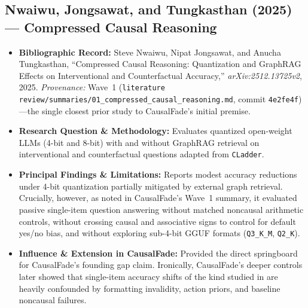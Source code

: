 \subsection{Nwaiwu, Jongsawat, and Tungkasthan (2025) --- Compressed Causal Reasoning \citep{nwaiwu2025compressed}}
\begin{itemize}
  \item \textbf{Bibliographic Record:} Steve Nwaiwu, Nipat Jongsawat, and Anucha Tungkasthan, ``Compressed Causal Reasoning: Quantization and GraphRAG Effects on Interventional and Counterfactual Accuracy,'' \emph{arXiv:2512.13725v2}, 2025. \emph{Provenance:} Wave~1 (\texttt{literature review/summaries/01\_compressed\_causal\_reasoning.md}, commit \texttt{4e2fe4f})---the single closest prior study to CausalFade's initial premise.
  \item \textbf{Research Question \& Methodology:} Evaluates quantized open-weight LLMs (4-bit and 8-bit) with and without GraphRAG retrieval on interventional and counterfactual questions adapted from \texttt{CLadder}.
  \item \textbf{Principal Findings \& Limitations:} Reports modest accuracy reductions under 4-bit quantization partially mitigated by external graph retrieval. Crucially, however, as noted in CausalFade's Wave~1 summary, it evaluated passive single-item question answering without matched noncausal arithmetic controls, without crossing causal and associative signs to control for default yes/no bias, and without exploring sub-4-bit GGUF formats (\texttt{Q3\_K\_M}, \texttt{Q2\_K}).
  \item \textbf{Influence \& Extension in CausalFade:} Provided the direct springboard for CausalFade's founding gap claim. Ironically, CausalFade's deeper controls later showed that single-item accuracy shifts of the kind studied in \citet{nwaiwu2025compressed} are heavily confounded by formatting invalidity, action priors, and baseline noncausal failures.
\end{itemize}

